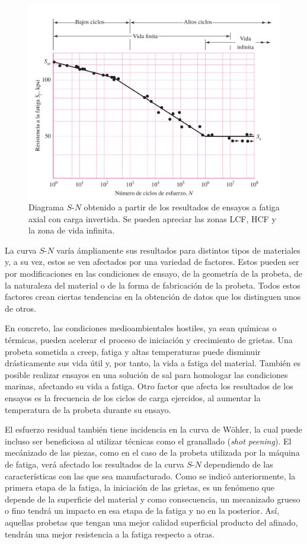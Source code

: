 \begin{figure}[h]
\centering
\includegraphics[width=0.75\linewidth]{Imagenes/lcf_hcf.pdf}
\caption{Diagrama $S$-$N$ obtenido a partir de los resultados de ensayos a fatiga axial con carga invertida. Se pueden apreciar las zonas LCF, HCF y la zona de vida infinita. \cite{budynas2008shigley}}
\label{fig:lcf_hcf}
\end{figure}

La curva $S$-$N$ varía ámpliamente sus resultados para distintos tipos de materiales y, a su vez, estos se ven afectados por una variedad de factores. Estos pueden ser por modificaciones en las condiciones de ensayo, de la geometría de la probeta, de la naturaleza del material o de la forma de fabricación de la probeta. Todos estos factores crean ciertas tendencias en la obtención de datos que los distinguen unos de otros. 

En concreto, las condiciones medioambientales hostiles, ya sean químicas o térmicas, pueden acelerar el proceso de iniciación y crecimiento de grietas. Una probeta sometida a creep, fatiga y altas temperaturas puede disminuir drásticamente sus vida útil y, por tanto, la vida a fatiga del material. También es posible realizar ensayos en una solución de sal para homologar las condiciones marinas, afectando su vida a fatiga. Otro factor que afecta los resultados de los ensayos es la frecuencia de los ciclos de carga ejercidos, al aumentar la temperatura de la probeta durante su ensayo.

El esfuerzo residual también tiene incidencia en la curva de Wöhler, la cual puede incluso ser beneficiosa al utilizar técnicas como el granallado (\textit{shot peening}). El mecánizado de las piezas, como en el caso de la probeta utilizada por la máquina de fatiga, verá afectado los resultados de la curva $S$-$N$ dependiendo de las características con las que sea manufacturado. Como se indicó anteriormente, la primera etapa de la fatiga, la iniciación de las grietas, es un fenómeno que depende de la superficie del material y como consecuencia, un mecanizado grueso o fino tendrá un impacto en esa etapa de la fatiga y no en la posterior. Así, aquellas probetas que tengan una mejor calidad superficial producto del afinado, tendrán una mejor resistencia a la fatiga respecto a otras.

